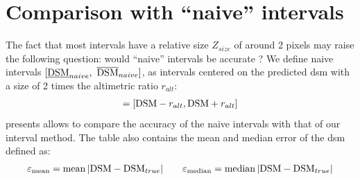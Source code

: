 
\section{Comparison with ``naive'' intervals}
The fact that most intervals have a relative size $Z_{size}$ of around 2 pixels may raise the following question: would ``naive'' intervals be accurate ? We define naive intervals $[\underline{\mathrm{DSM}}_{naive}, ~\overline{\mathrm{DSM}}_{naive}]$, as intervals centered on the predicted \acrshort{dsm} with a size of 2 times the altimetric ratio $r_{alt}$:
\begin{align}
    [\underline{\DSM}_{naive}, ~\overline{\DSM}_{naive}] = [\DSM-r_{alt}, \DSM+r_{alt}]
\end{align}
 presents allows to compare the accuracy of the naive intervals with that of our interval method. The table also contains the mean and median error of the \acrshort{dsm} defined as:
\begin{align}
    \varepsilon_{\operatorname*{mean}} = \operatorname*{mean}|\mathrm{DSM} - \mathrm{DSM}_{true}|\qquad \varepsilon_{\operatorname*{median}} = \operatorname*{median}|\mathrm{DSM} - \mathrm{DSM}_{true}|
\end{align}

